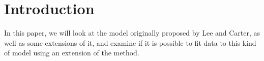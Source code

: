 \section{Introduction}
In this paper, we will look at the model originally proposed by Lee and Carter, as well as some extensions of it, and examine if it is possible to fit data to this kind of model using an extension of the \inla method. 